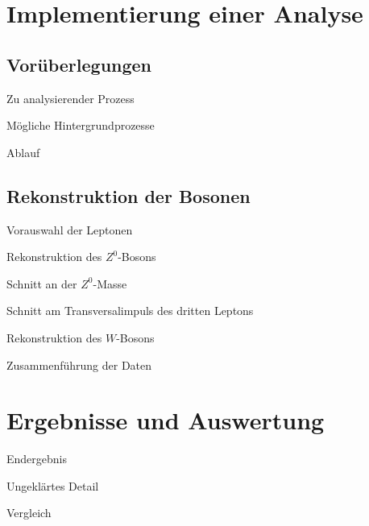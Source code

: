 \documentclass{beamer}
\begin{document}
\section{Implementierung einer Analyse}
\subsection{Vorüberlegungen}
\begin{frame}{Zu analysierender Prozess}
\end{frame}

\begin{frame}{Mögliche Hintergrundprozesse}
\end{frame}

\begin{frame}{Ablauf}
\end{frame}

\subsection{Rekonstruktion der Bosonen}
\begin{frame}{Vorauswahl der Leptonen}
\end{frame}

\begin{frame}{Rekonstruktion des $Z^0$-Bosons}
\end{frame}
\begin{frame}{Schnitt an der $Z^0$-Masse}
\end{frame}
\begin{frame}{Schnitt am Transversalimpuls des dritten Leptons}
\end{frame}
\begin{frame}{Rekonstruktion des $W$-Bosons}
\end{frame}

\begin{frame}{Zusammenführung der Daten}
\end{frame}

\section{Ergebnisse und Auswertung}
\begin{frame}{Endergebnis}
\end{frame}

\begin{frame}{Ungeklärtes Detail}
\end{frame}

\begin{frame}{Vergleich}
\end{frame}
\end{document}

